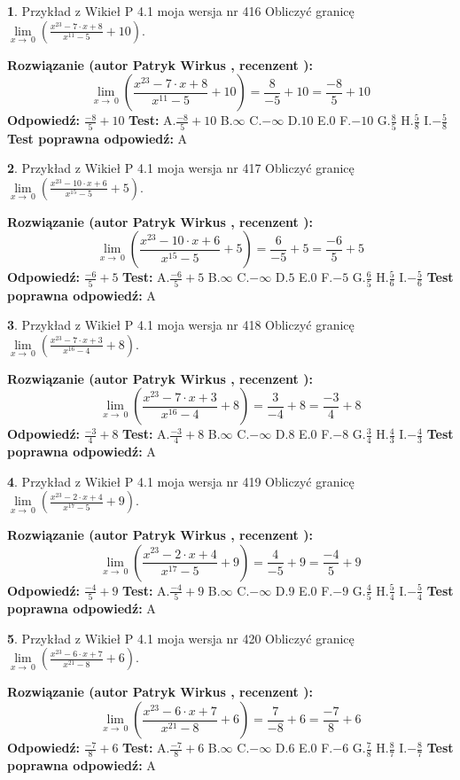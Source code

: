 \documentclass[12pt, a4paper]{article}
\theoremstyle{definition} %
\newtheorem{zad}{}
\newcommand{\zadStart}[1]{\begin{zad}#1\newline}
\newcommand{\zadStop}{\end{zad}}
\newcommand{\rozwStart}[2]{\noindent \textbf{Rozwiązanie (autor #1 , recenzent #2): }\newline}
\newcommand{\rozwStop}{\newline}
\newcommand{\odpStart}{\noindent \textbf{Odpowiedź:}\newline}
\newcommand{\odpStop}{\newline}
\newcommand{\testStart}{\noindent \textbf{Test:}\newline}
\newcommand{\testStop}{\newline}
\newcommand{\kluczStart}{\noindent \textbf{Test poprawna odpowiedź:}\newline}
\newcommand{\kluczStop}{\newline}
\begin{document}
\zadStart{Przykład z Wikieł P 4.1 moja wersja nr 416}
Obliczyć granicę $\lim\limits_{x\to\ 0}(\frac{x^{23}-7 \cdot x +8}{x^{11}-5}+10)$.
\zadStop
\rozwStart{Patryk Wirkus}{}
$$\lim\limits_{x\to\ 0}(\frac{x^{23}-7 \cdot x +8}{x^{11}-5}+10)=\frac{8}{-5}+10=\frac{-8}{5}+10$$
\rozwStop
\odpStart
$\frac{-8}{5}+10$
\odpStop
\testStart
A.$\frac{-8}{5}+10$
B.$\infty$
C.$-\infty$
D.$10$
E.$0$
F.$-10$
G.$\frac{8}{5}$
H.$\frac{5}{8}$
I.$-\frac{5}{8}$
\testStop
\kluczStart
A
\kluczStop



\zadStart{Przykład z Wikieł P 4.1 moja wersja nr 417}
Obliczyć granicę $\lim\limits_{x\to\ 0}(\frac{x^{23}-10 \cdot x +6}{x^{15}-5}+5)$.
\zadStop
\rozwStart{Patryk Wirkus}{}
$$\lim\limits_{x\to\ 0}(\frac{x^{23}-10 \cdot x +6}{x^{15}-5}+5)=\frac{6}{-5}+5=\frac{-6}{5}+5$$
\rozwStop
\odpStart
$\frac{-6}{5}+5$
\odpStop
\testStart
A.$\frac{-6}{5}+5$
B.$\infty$
C.$-\infty$
D.$5$
E.$0$
F.$-5$
G.$\frac{6}{5}$
H.$\frac{5}{6}$
I.$-\frac{5}{6}$
\testStop
\kluczStart
A
\kluczStop



\zadStart{Przykład z Wikieł P 4.1 moja wersja nr 418}
Obliczyć granicę $\lim\limits_{x\to\ 0}(\frac{x^{23}-7 \cdot x +3}{x^{16}-4}+8)$.
\zadStop
\rozwStart{Patryk Wirkus}{}
$$\lim\limits_{x\to\ 0}(\frac{x^{23}-7 \cdot x +3}{x^{16}-4}+8)=\frac{3}{-4}+8=\frac{-3}{4}+8$$
\rozwStop
\odpStart
$\frac{-3}{4}+8$
\odpStop
\testStart
A.$\frac{-3}{4}+8$
B.$\infty$
C.$-\infty$
D.$8$
E.$0$
F.$-8$
G.$\frac{3}{4}$
H.$\frac{4}{3}$
I.$-\frac{4}{3}$
\testStop
\kluczStart
A
\kluczStop



\zadStart{Przykład z Wikieł P 4.1 moja wersja nr 419}
Obliczyć granicę $\lim\limits_{x\to\ 0}(\frac{x^{23}-2 \cdot x +4}{x^{17}-5}+9)$.
\zadStop
\rozwStart{Patryk Wirkus}{}
$$\lim\limits_{x\to\ 0}(\frac{x^{23}-2 \cdot x +4}{x^{17}-5}+9)=\frac{4}{-5}+9=\frac{-4}{5}+9$$
\rozwStop
\odpStart
$\frac{-4}{5}+9$
\odpStop
\testStart
A.$\frac{-4}{5}+9$
B.$\infty$
C.$-\infty$
D.$9$
E.$0$
F.$-9$
G.$\frac{4}{5}$
H.$\frac{5}{4}$
I.$-\frac{5}{4}$
\testStop
\kluczStart
A
\kluczStop



\zadStart{Przykład z Wikieł P 4.1 moja wersja nr 420}
Obliczyć granicę $\lim\limits_{x\to\ 0}(\frac{x^{23}-6 \cdot x +7}{x^{21}-8}+6)$.
\zadStop
\rozwStart{Patryk Wirkus}{}
$$\lim\limits_{x\to\ 0}(\frac{x^{23}-6 \cdot x +7}{x^{21}-8}+6)=\frac{7}{-8}+6=\frac{-7}{8}+6$$
\rozwStop
\odpStart
$\frac{-7}{8}+6$
\odpStop
\testStart
A.$\frac{-7}{8}+6$
B.$\infty$
C.$-\infty$
D.$6$
E.$0$
F.$-6$
G.$\frac{7}{8}$
H.$\frac{8}{7}$
I.$-\frac{8}{7}$
\testStop
\kluczStart
A
\kluczStop
\end{document}
